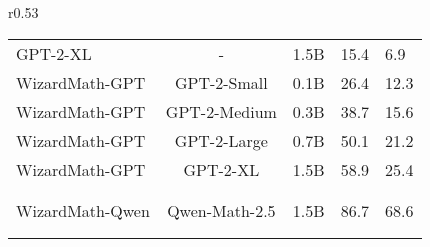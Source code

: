 \begin{wraptable}{r}{0.53\textwidth}
{\begin{tabular}{lccll}
    GPT-2-XL~\citep{brown2020language_gpt2} & - & 1.5B & 15.4 & 6.9 \\
    \rowcolor{gray!30}
    WizardMath-GPT & GPT-2-Small & 0.1B & 26.4 & 12.3 \\ 
    \rowcolor{gray!30}
    WizardMath-GPT & GPT-2-Medium & 0.3B & 38.7 & 15.6 \\  
    \rowcolor{gray!30}
    WizardMath-GPT & GPT-2-Large & 0.7B & 50.1 & 21.2 \\  
    \rowcolor{gray!30}
    WizardMath-GPT & GPT-2-XL & 1.5B & 58.9 & 25.4 \\  \\[-0.7em]  \hdashline \\[-0.7em]
    \rowcolor{gray!30}
    WizardMath-Qwen & Qwen-Math-2.5 & 1.5B & 86.7 & 68.6 \\  

    \\[-0.7em]  \hdashline \\[-0.7em]
    

\end{tabular}}
\end{wraptable}
